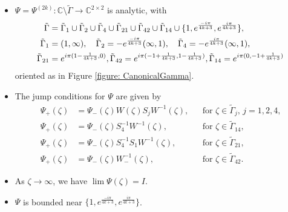 \documentclass[11pt,fleqn]{article}
\numberwithin{equation}{section}
\begin{document}
\begin{itemize}
    \item[(a)] $\Psi = \Psi^{(2k)}: \mathbb C\setminus \tilde \Gamma\to \mathbb C^{2\times 2}$ is analytic, with
%
     \begin{align*}
     \tilde \Gamma &= \tilde\Gamma_1\cup\tilde\Gamma_2\cup \tilde\Gamma_4 \cup \tilde\Gamma_{21} \cup \tilde\Gamma_{42} \cup \tilde\Gamma_{14}\cup\{1,e^{\frac{-i\pi}{4k+3}},e^{\frac{i\pi}{4k+3}}\}, \\
      \tilde \Gamma_1 & = (1,\infty), \quad \tilde \Gamma_2=-e^{\frac{-i\pi}{4k+3}} (\infty,1), \quad \tilde \Gamma_4=-e^{\frac{i\pi}{4k+3}}(\infty,1), \\
      \tilde \Gamma_{21} & = e^{i \pi (1-{1  \over 4 k + 3},0)},  \tilde \Gamma_{42}  = e^{i \pi (-1+{1  \over 4 k + 3},1-{1  \over 4 k + 3})} ,  \tilde \Gamma_{14}  = e^{i \pi (0,-1+{1  \over 4 k + 3})}
      \end{align*}
       oriented as in Figure \ref{figure: CanonicalGamma}.
%
       \item[(b)] The jump conditions for $\Psi$ are given by
    \begin{align*}
        \Psi_+(\zeta)&=\Psi_-(\zeta)
            W(\zeta) S_j W^{-1}(\zeta),&& \mbox{for $\zeta\in\tilde \Gamma_j$, $j = 1, 2, 4$,}\\
            \Psi_+(\zeta)&=\Psi_-(\zeta)   S_4^{-1}W^{-1}(\zeta) ,&& \mbox{for $\zeta\in\tilde \Gamma_{14}$},\\
              \Psi_+(\zeta)&=\Psi_-(\zeta) S_4^{-1} S_1 W^{-1}(\zeta) ,&& \mbox{for $\zeta\in\tilde \Gamma_{21}$},\\
              \Psi_+(\zeta)&=\Psi_-(\zeta) W_-^{-1}(\zeta) ,&& \mbox{for $\zeta\in\tilde \Gamma_{42}$}.
    \end{align*}
    \item[(c)] As $\zeta\to\infty$, we have $\lim\Psi(\zeta)=I$.
    \item[(d)] $\Psi$ is bounded near $\{1,e^{\frac{-i\pi}{4k+3}},e^{\frac{i\pi}{4k+3}}\}$.
\end{itemize}
\end{document}
